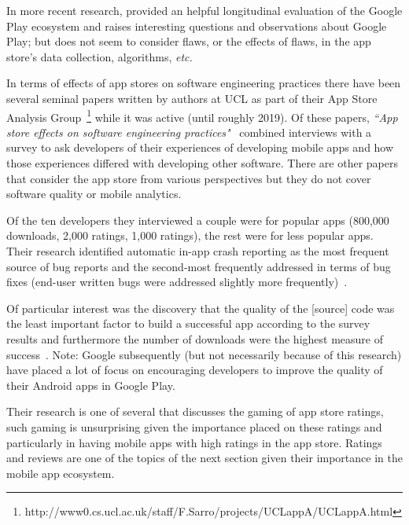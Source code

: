 In more recent research, \textcite{wang2019_understanding_the_evolution_of_mobile_app_ecosystems_a_longitudinal_measurement_of_google_play} provided an helpful longitudinal evaluation of the Google Play ecosystem and raises interesting questions and observations about Google Play; but does not seem to consider flaws, or the effects of flaws, in the app store's data collection, algorithms,\textit{ etc.}

In terms of effects of app stores on software engineering practices there have been several seminal papers written by authors at UCL as part of their App Store Analysis Group~\footnote{http://www0.cs.ucl.ac.uk/staff/F.Sarro/projects/UCLappA/UCLappA.html} while it was active (until roughly 2019). Of these papers, \emph{``App store effects on software engineering practices"}~ combined interviews with a survey to ask developers of their experiences of developing mobile apps and how those experiences differed with developing other software. There are  other papers that consider the app store from various perspectives but they do not cover software quality or mobile analytics.

Of the ten developers they interviewed a couple were for popular apps (800,000 downloads, 2,000 ratings, 1,000 ratings), the rest were for less popular apps. %
Their research identified automatic in-app crash reporting as the most frequent source of bug reports and the second-most frequently addressed in terms of bug fixes (end-user written bugs were addressed slightly more frequently)~\cite[p. 10]{alsubaihin2019app_store_effects_on_software_engineering}. 

Of particular interest was the discovery that the quality of the [source] code was the least important factor to build a successful app according to the survey results and furthermore the number of downloads were the highest measure of success~\cite[p. 13]{alsubaihin2019app_store_effects_on_software_engineering}. Note: Google subsequently (but not necessarily because of this research) have placed a lot of focus on encouraging developers to improve the quality of their Android apps in Google Play. 

Their research is one of several that discusses the gaming of app store ratings, such gaming is unsurprising given the importance placed on these ratings and particularly in having mobile apps with high ratings in the app store. Ratings and reviews are one of the topics of the next section  given their importance in the mobile app ecosystem.

